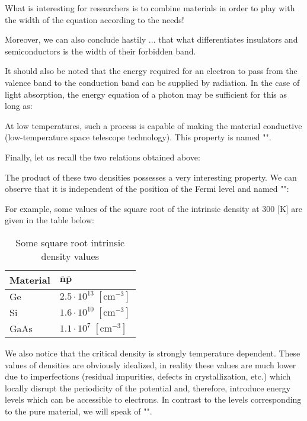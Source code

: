 	What is interesting for researchers is to combine materials in order to play with the width of the equation according to the needs!

	Moreover, we can also conclude hastily ... that what differentiates insulators and semiconductors is the width of their forbidden band.

	It should also be noted that the energy required for an electron to pass from the valence band to the conduction band can be supplied by radiation. In the case of light absorption, the energy equation of a photon may be sufficient for this as long as:
	
	At low temperatures, such a process is capable of making the material conductive (low-temperature space telescope technology). This property is named "".

	Finally, let us recall the two relations obtained above:
	
	The product of these two densities possesses a very interesting property. We can observe that it is independent of the position of the Fermi level and named "":
	
	For example, some values of the square root of the intrinsic density at $300$ [K] are given in the table below:
	\begin{table}[H]
		\centering
		\begin{tabular}{|l|l|}
		\hline
		\rowcolor[HTML]{9B9B9B} 
		\textbf{Material} & $\pmb{\bar{n}\bar{p}}$ \\ \hline
		$\mathrm{Ge}$ & $2.5\cdot 10^{13}\;[\text{cm}^{-3}]$ \\ \hline
		$\mathrm{Si}$ & $1.6\cdot 10^{10}\;[\text{cm}^{-3}]$ \\ \hline
		$\mathrm{GaAs}$ & $1.1\cdot 10^{7}\;[\text{cm}^{-3}]$ \\ \hline
		\end{tabular}
		\caption[]{Some square root intrinsic density values}
	\end{table}
	We also notice that the critical density is strongly temperature dependent. These values of densities are obviously idealized, in reality these values are much lower due to imperfections (residual impurities, defects in crystallization, etc.) which locally disrupt the periodicity of the potential and, therefore, introduce energy levels which can be accessible to electrons. In contrast to the levels corresponding to the pure material, we will speak of "".
	
